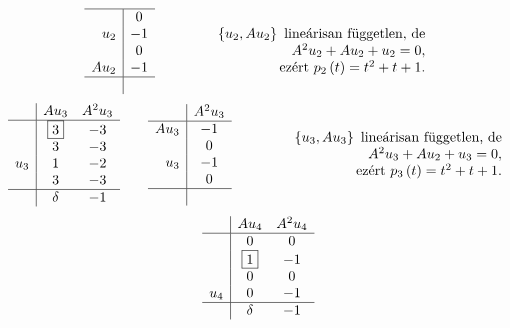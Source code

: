 \documentclass[a4paper, showtrims]{memoir}
\makeatletter
\renewenvironment{proof}[1][\proofname]
    {\par\pushQED{\qed}%
    \normalfont \topsep6\p@\@plus6\p@\relax
    \trivlist
    \item[\hskip\labelsep
        \itshape
    #1\@addpunct{:}]\ignorespaces}
    {\popQED\endtrivlist\@endpefalse}
\theoremstyle{plain}
\theoremstyle{remark}
\theoremstyle{definition}
\makeatother
\begin{document}
\begin{proof}[Megoldás]
\[\begin{array}{r|c}
			\hline
			     & 0      \\
			u_2  & -1     \\
			     & 0      \\
			Au_2 & -1     \\
			\hline
			     &
		\end{array}
		\qquad\qquad
		\begin{array}{r}
			\left\{ u_2,Au_2 \right\}\mbox{ lineárisan független, de} \\
			A^2u_2+Au_2+u_2=0,                                        \\
			\mbox{ezért } p_2\left( t \right)=t^2+t+1.
		\end{array}
	\]
	\[
		\begin{array}{r|cc}
			    & Au_3         & A^2u_3 \\
			\hline
			    & \framebox{3} & -3     \\
			    & 3            & -3     \\
			u_3 & 1            & -2     \\
			    & 3            & -3     \\
			\hline
			    & \delta       & -1
		\end{array}
		\qquad
		\begin{array}{r|c}
			     & A^2u_3 \\
			\hline
			Au_3 & -1     \\
			     & 0      \\
			u_3  & -1     \\
			     & 0      \\
			\hline
			     &
		\end{array}
		\qquad\qquad
		\begin{array}{r}
			\left\{ u_3,Au_3 \right\}\mbox{ lineárisan független, de} \\
			A^2u_3+Au_2+u_3=0,                                        \\
			\mbox{ezért } p_3\left( t \right)=t^2+t+1.
		\end{array}
	\]
	\[
		\begin{array}{r|cc}
			    & Au_4         & A^2u_4 \\
			\hline
			    & 0            & 0      \\
			    & \framebox{1} & -1     \\
			    & 0            & 0      \\
			u_4 & 0            & -1     \\
			\hline
			    & \delta       & -1
		\end{array}
\]
\end{proof}
\end{document}
